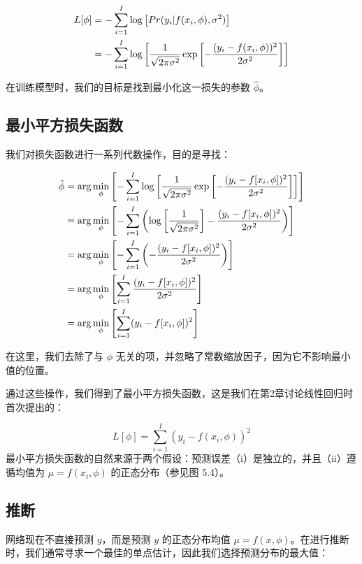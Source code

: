 \begin{align}
	L[\phi] &= - \sum_{i=1}^{I} \log \left[ Pr(y_i|f(x_i, \phi), \sigma^2) \right] \notag \\
	&= - \sum_{i=1}^{I} \log \left[ \frac{1}{\sqrt{2\pi\sigma^2}} \exp \left[ -\frac{(y_i - f(x_i, \phi))^2}{2\sigma^2} \right] \right] 
\end{align}

在训练模型时，我们的目标是找到最小化这一损失的参数 \(\hat{\phi}\)。

\subsection{最小平方损失函数}

我们对损失函数进行一系列代数操作，目的是寻找：


\begin{align}
\hat{\phi} &= \arg\min_{\phi} \left[ -\sum_{i=1}^{I} \log \left[ \frac{1}{\sqrt{2\pi\sigma^2}} \exp \left[ -\frac{(y_i - f[x_i, \phi])^2}{2\sigma^2} \right] \right] \right] \notag \\
&= \arg\min_{\phi} \left[ -\sum_{i=1}^{I} \left( \log \left[ \frac{1}{\sqrt{2\pi\sigma^2}} \right] - \frac{(y_i - f[x_i, \phi])^2}{2\sigma^2} \right) \right] \notag \\
&= \arg\min_{\phi} \left[ -\sum_{i=1}^{I} \left( -\frac{(y_i - f[x_i, \phi])^2}{2\sigma^2} \right) \right] \notag \\
&= \arg\min_{\phi} \left[ \sum_{i=1}^{I} \frac{(y_i - f[x_i, \phi])^2}{2\sigma^2} \right] \notag \\
&= \arg\min_{\phi} \left[ \sum_{i=1}^{I} (y_i - f[x_i, \phi])^2 \right]
\end{align}

在这里，我们去除了与 \(\phi\) 无关的项，并忽略了常数缩放因子，因为它不影响最小值的位置。

通过这些操作，我们得到了最小平方损失函数，这是我们在第2章讨论线性回归时首次提出的：

\begin{equation}
L[\phi] = \sum_{i=1}^{I} (y_i - f(x_i, \phi))^2 
\end{equation}
最小平方损失函数的自然来源于两个假设：预测误差（i）是独立的，并且（ii）遵循均值为 \(\mu = f(x_i, \phi)\) 的正态分布（参见图 5.4）。


\subsection{推断}

网络现在不直接预测 \(y\)，而是预测 \(y\) 的正态分布均值 \(\mu = f(x, \phi)\)。在进行推断时，我们通常寻求一个最佳的单点估计，因此我们选择预测分布的最大值：

